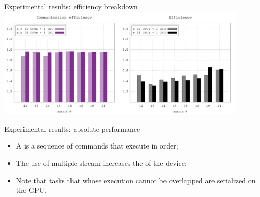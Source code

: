 \begin{frame}{Experimental results: efficiency breakdown}
  \centering
  \includegraphics[width=0.9\textwidth]{data/eff_sirocco3}
\end{frame}

\begin{frame}{Experimental results: absolute performance}
  \centering

  \begin{itemize}
  \item A  is a sequence of commands that execute in order;
  \item The use of multiple stream increases the  of the
    device;
  \item Note that tasks that whose execution cannot be overlapped are
    serialized on the GPU.
  \end{itemize}
\end{frame}

